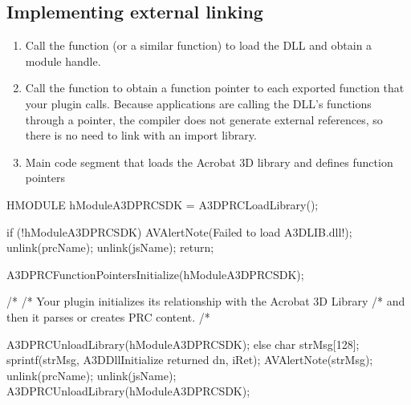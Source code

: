 \documentclass[letterpaper,12pt,english,openany,oneside]{sphinxmanual}
\begin{document}
\subsection{Implementing external linking}
\label{\detokenize{Plugins_A3D_API:implementing-external-linking}}\begin{enumerate}
%
\item {} 
Call the  function (or a similar function) to load the DLL and obtain a module handle.

\item {} 
Call the  function to obtain a function pointer to each exported function that your plugin calls. Because applications are calling the DLL’s functions through a pointer, the compiler does not generate external references, so there is no need to link with an import library.

\item {} 
Main code segment that loads the Acrobat 3D library and defines function pointers

\end{enumerate}

\begin{sphinxVerbatim}[commandchars=\\\{\}]
HMODULE hModuleA3DPRCSDK = A3DPRCLoadLibrary();

if (!hModuleA3DPRCSDK) \PYGZob{}
  AVAlertNote(\PYGZdq{}Failed to load A3DLIB.dll!\PYGZdq{});
  \PYGZus{}unlink(prcName);
  \PYGZus{}unlink(jsName);
  return;
\PYGZcb{}

A3DPRCFunctionPointersInitialize(hModuleA3DPRCSDK);

/*\PYGZhy{}\PYGZhy{}\PYGZhy{}\PYGZhy{}\PYGZhy{}\PYGZhy{}\PYGZhy{}\PYGZhy{}\PYGZhy{}\PYGZhy{}\PYGZhy{}\PYGZhy{}\PYGZhy{}\PYGZhy{}\PYGZhy{}\PYGZhy{}\PYGZhy{}\PYGZhy{}\PYGZhy{}\PYGZhy{}\PYGZhy{}\PYGZhy{}\PYGZhy{}\PYGZhy{}\PYGZhy{}\PYGZhy{}\PYGZhy{}\PYGZhy{}\PYGZhy{}\PYGZhy{}\PYGZhy{}\PYGZhy{}\PYGZhy{}\PYGZhy{}\PYGZhy{}\PYGZhy{}
/* Your plugin initializes its relationship with the Acrobat 3D Library
/* and then it parses or creates PRC content.
/*\PYGZhy{}\PYGZhy{}\PYGZhy{}\PYGZhy{}\PYGZhy{}\PYGZhy{}\PYGZhy{}\PYGZhy{}\PYGZhy{}\PYGZhy{}\PYGZhy{}\PYGZhy{}\PYGZhy{}\PYGZhy{}\PYGZhy{}\PYGZhy{}\PYGZhy{}\PYGZhy{}\PYGZhy{}\PYGZhy{}\PYGZhy{}\PYGZhy{}\PYGZhy{}\PYGZhy{}\PYGZhy{}\PYGZhy{}\PYGZhy{}\PYGZhy{}\PYGZhy{}\PYGZhy{}\PYGZhy{}\PYGZhy{}\PYGZhy{}\PYGZhy{}\PYGZhy{}\PYGZhy{}

A3DPRCUnloadLibrary(hModuleA3DPRCSDK);
\PYGZcb{} else \PYGZob{}
  char strMsg[128];
  sprintf(strMsg, \PYGZdq{}A3DDllInitialize returned \PYGZpc{}dn\PYGZdq{}, iRet);
  AVAlertNote(strMsg);
  \PYGZus{}unlink(prcName);
  \PYGZus{}unlink(jsName);
  A3DPRCUnloadLibrary(hModuleA3DPRCSDK);
\PYGZcb{}
\end{sphinxVerbatim}
\end{document}
